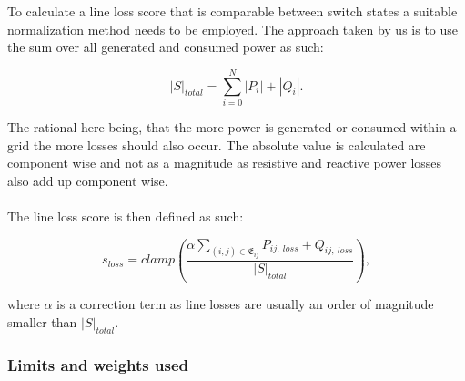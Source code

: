 To calculate a line loss score that is comparable between switch states a suitable
normalization method needs to be employed. The approach taken by us is to use the 
sum over all generated and consumed power as such:

\begin{equation}
    |S|_{total} = \sum_{i=0}^N |P_i| + |Q_i|.
\end{equation}

The rational here being, that the more power is generated or consumed within a grid
the more losses should also occur. The absolute value is calculated are component wise
and not as a magnitude as resistive and reactive power losses also add up component wise.\\
\\
The line loss score is then defined as such:

\begin{equation}
    s_{loss} = clamp(\frac{\alpha \sum_{(i, j) \in \mathfrak{E}_{ij}} P_{ij, \ loss} + Q_{ij, \ loss}}{|S|_{total}}),
\end{equation}

where $\alpha$ is a correction term as line losses are usually an order of magnitude
smaller than $|S|_{total}$.

\subsubsection{Limits and weights used}

